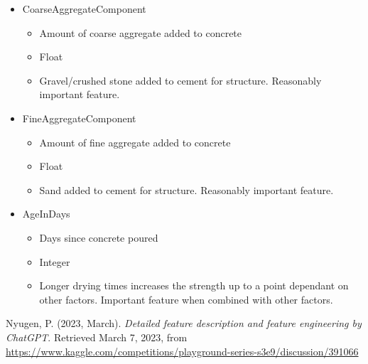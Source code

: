 \documentclass[11pt]{article}
\begin{document}
\begin{itemize}
\begin{itemize}
  \end{itemize}
  \item CoarseAggregateComponent
  \begin{itemize}
    \item Amount of coarse aggregate added to concrete 
    \item Float
    \item Gravel/crushed stone added to cement for structure. Reasonably important feature. 
  \end{itemize}
  \item FineAggregateComponent
  \begin{itemize}
    \item Amount of fine aggregate added to concrete 
    \item Float
    \item Sand added to cement for structure. Reasonably important feature. 
  \end{itemize}
  \item AgeInDays
  \begin{itemize}
    \item Days since concrete poured 
    \item Integer
    \item Longer drying times increases the strength up to a point dependant on other factors. Important feature when combined with other factors. 
  \end{itemize}
\end{itemize}

\begin{thebibliography}{9}
  Nyugen, P. (2023, March). \textit{Detailed feature description and feature engineering by ChatGPT}. 
  Retrieved March 7, 2023, 
  from \url{https://www.kaggle.com/competitions/playground-series-s3e9/discussion/391066}

\end{thebibliography}
\end{document}
